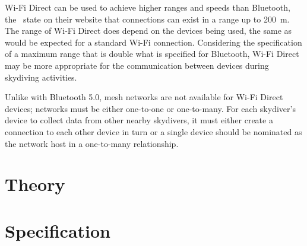 \documentclass[11pt, twocolumn]{article}
\begin{document}
Wi-Fi Direct can be used to achieve higher ranges and speeds than Bluetooth, the~\citeauthor{wi-fi_alliance_wi-fi_nodate} state on their website that connections can exist in a range up to \SI{200}{\metre}. The range of Wi-Fi Direct does depend on the devices being used, the same as would be expected for a standard Wi-Fi connection. Considering the specification of a maximum range that is double what is specified for Bluetooth, Wi-Fi Direct may be more appropriate for the communication between devices during skydiving activities.

Unlike with Bluetooth 5.0, mesh networks are not available for Wi-Fi Direct devices; networks must be either one-to-one or one-to-many. For each skydiver's device to collect data from other nearby skydivers, it must either create a connection to each other device in turn or a single device should be nominated as the network host in a one-to-many relationship.

\section{Theory}\label{sec:theory} %




\section{Specification}\label{sec:specification} %







\end{document}
